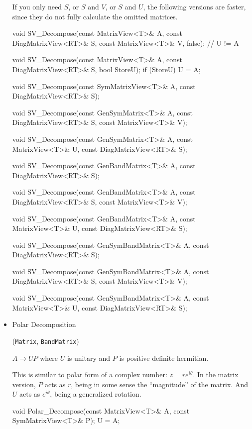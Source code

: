 \documentclass[twoside,letterpaper,11pt]{article}
\renewcommand{\tt}[1]{{\lstinline {#1}}}
\begin{document}
\begin{itemize}
If you only need $S$, or $S$ and $V$, or $S$ and $U$, the following 
versions are faster, since they do
not fully calculate the omitted matrices.  
\begin{tmvcode}
void SV_Decompose(const MatrixView<T>& A, 
      const DiagMatrixView<RT>& S, const MatrixView<T>& V, false);
// U != A

void SV_Decompose(const MatrixView<T>& A, 
      const DiagMatrixView<RT>& S, bool StoreU);
if (StoreU) U = A;

void SV_Decompose(const SymMatrixView<T>& A, 
      const DiagMatrixView<RT>& S);
      
void SV_Decompose(const GenSymMatrix<T>& A,
      const DiagMatrixView<RT>& S, const MatrixView<T>& V);
      
void SV_Decompose(const GenSymMatrix<T>& A,
      const MatrixView<T>& U, const DiagMatrixView<RT>& S);
      
void SV_Decompose(const GenBandMatrix<T>& A, 
      const DiagMatrixView<RT>& S);

void SV_Decompose(const GenBandMatrix<T>& A,
      const DiagMatrixView<RT>& S, const MatrixView<T>& V);
      
void SV_Decompose(const GenBandMatrix<T>& A,
      const MatrixView<T>& U, const DiagMatrixView<RT>& S);
      
void SV_Decompose(const GenSymBandMatrix<T>& A, 
      const DiagMatrixView<RT>& S);
      
void SV_Decompose(const GenSymBandMatrix<T>& A,
      const DiagMatrixView<RT>& S, const MatrixView<T>& V);

void SV_Decompose(const GenSymBandMatrix<T>& A,
      const MatrixView<T>& U, const DiagMatrixView<RT>& S);
\end{tmvcode}

\item Polar Decomposition 

(\tt{Matrix}, \tt{BandMatrix})

$A \rightarrow U P$ where $U$ is unitary and $P$ is positive definite hermitian.

This is similar to polar form of a complex number: $z = r e^{i \theta}$.
In the matrix version, $P$ acts as $r$, being in some sense the ``magnitude'' 
of the matrix.  And $U$ acts as $e^{i \theta}$, being a generalized rotation.

\begin{tmvcode}
void Polar_Decompose(const MatrixView<T>& A, 
      const SymMatrixView<T>& P);
U = A;


\end{tmvcode}
\end{itemize}
\end{document}
